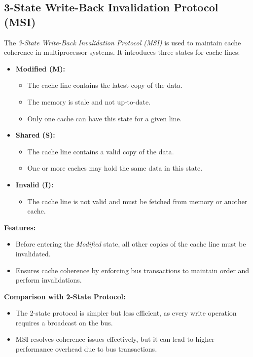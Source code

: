 \subsection{3-State Write-Back Invalidation Protocol (MSI)}
The \textit{3-State Write-Back Invalidation Protocol (MSI)} is used to maintain cache coherence in multiprocessor systems. It introduces three states for cache lines:
\begin{itemize}
    \item \textbf{Modified (M):}
    \begin{itemize}
        \item The cache line contains the latest copy of the data.
        \item The memory is stale and not up-to-date.
        \item Only one cache can have this state for a given line.
    \end{itemize}

    \item \textbf{Shared (S):}
    \begin{itemize}
        \item The cache line contains a valid copy of the data.
        \item One or more caches may hold the same data in this state.
    \end{itemize}

    \item \textbf{Invalid (I):}
    \begin{itemize}
        \item The cache line is not valid and must be fetched from memory or another cache.
    \end{itemize}
\end{itemize}

\noindent\textbf{Features:}
\begin{itemize}
    \item Before entering the \textit{Modified} state, all other copies of the cache line must be invalidated.
    \item Ensures cache coherence by enforcing bus transactions to maintain order and perform invalidations.
\end{itemize}

\noindent\textbf{Comparison with 2-State Protocol:}
\begin{itemize}
    \item The 2-state protocol is simpler but less efficient, as every write operation requires a broadcast on the bus.
    \item MSI resolves coherence issues effectively, but it can lead to higher performance overhead due to bus transactions.
\end{itemize}

